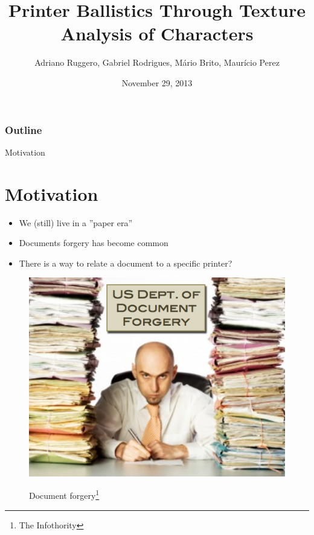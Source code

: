 \documentclass[notes]{beamer}
\title{Printer Ballistics Through Texture Analysis of Characters}
\subtitle{}
\institute{Institute of Computing - Unicamp}
\date{November 29, 2013}
\author{Adriano Ruggero, Gabriel Rodrigues, Mário Brito, Maurício Perez}
\begin{document}
\begin{frame}
  \titlepage
\end{frame}

\begin{frame}
  \frametitle{Outline}
  \tableofcontents
\end{frame}

\begin{frame}

\begin{block}{Motivation}
\section{Motivation}
\begin{itemize}

\item We (still) live in a ''paper era''

\item Documents forgery has become common

\item There is a way to relate a document to a specific printer?

\end{itemize}

\end{block}


\begin{figure}[!htb]
\centering
\includegraphics[scale=0.28]{forgery}
\label{fig:forgery}
\caption{Document forgery\footnote{The Infothority\cite{forgery}}}
\end{figure}
{\let\thefootnote\relax\footnotetext{}}
\end{frame}
\end{document}
